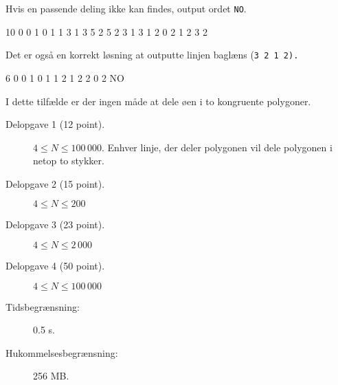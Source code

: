 \documentclass{boi2014-dk}
\newcommand{\constant}[1]{{\tt #1}}
\begin{document}
    Hvis en passende deling ikke kan findes, output ordet \constant{NO}.

    \Examples
	\example
	{
		10
		0 0
		1 0
		1 1
		3 1
		3 5
		2 5
		2 3
		1 3
		1 2
		0 2
	}
	{
		1 2 3 2
	}
	{
        Det er også en korrekt løsning at outputte linjen baglæns (\tt{3 2 1
        2}).

        \begin{center}
        \end{center}
	}

	\example
	{
		6
		0 0
		1 0
		1 1
		2 1
		2 2
		0 2
	}
	{
		NO
	}
    {
        I dette tilfælde er der ingen måde at dele øen i to kongruente
        polygoner.
        \begin{center}
        \end{center}
    }

    \Scoring

    \begin{description}
        \item[Delopgave 1 (12 point).] $4 \le N \le 100\,000$. Enhver linje,
            der deler polygonen vil dele polygonen i netop to stykker.
        \item[Delopgave 2 (15 point).] $4 \le N \le 200$
        \item[Delopgave 3 (23 point).] $4 \le N \le 2\,000$
        \item[Delopgave 4 (50 point).] $4 \le N \le 100\,000$
    \end{description}

    \Constraints

    \begin{description}
        \item[Tidsbegrænsning:] 0.5 s.
        \item[Hukommelsesbegrænsning:] 256 MB.
    \end{description}
\end{document}
